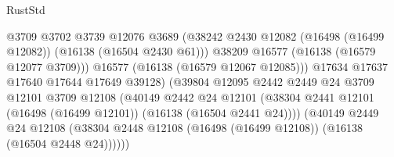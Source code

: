 \begin{lexlean}{RustStd}
\begin{coremodule}
                                              @3709
                                              @3702
                                              @3739
                                              @12076
                                              @3689
                                              (@38242
                                                @2430
                                                @12082
                                                (@16498 (@16499 @12082))
                                                (@16138 (@16504 @2430 @61)))
                                              @38209
                                              @16577
                                              (@16138 (@16579 @12077 @3709)))
                                            @16577
                                            (@16138 (@16579 @12067 @12085)))
                                          @17634
                                          @17637
                                          @17640
                                          @17644
                                          @17649
                                          @39128)
                                        (@39804
                                          @12095
                                          @2442
                                          @2449
                                          @24
                                          @3709
                                          @12101
                                          @3709
                                          @12108
                                          (@40149
                                            @2442
                                            @24
                                            @12101
                                            (@38304
                                              @2441
                                              @12101
                                              (@16498 (@16499 @12101))
                                              (@16138 (@16504 @2441 @24))))
                                          (@40149
                                            @2449
                                            @24
                                            @12108
                                            (@38304
                                              @2448
                                              @12108
                                              (@16498 (@16499 @12108))
                                              (@16138 (@16504 @2448 @24))))))

\end{coremodule}
\end{lexlean}
